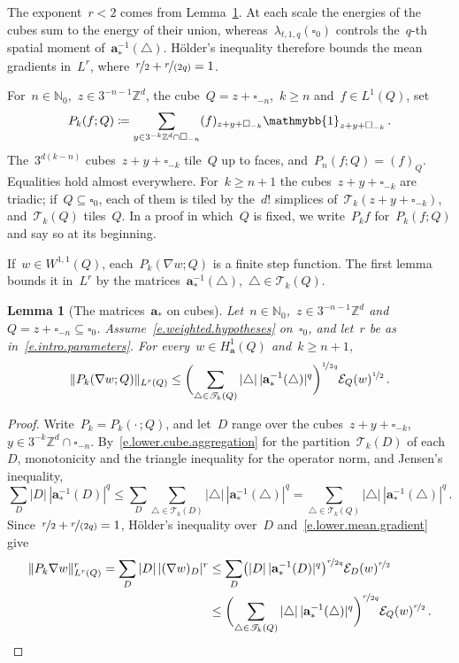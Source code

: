 \documentclass[11pt,letterpaper]{article}
\numberwithin{equation}{section}
\newtheorem{lemma}[theorem]{Lemma}
\theoremstyle{definition}
\newcommand{\N}{\mathbb{N}}
\newcommand{\Zd}{\mathbb{Z}^d}
\renewcommand{\a}{\mathbf{a}}
\newcommand{\nf}{\nicefrac}
\newcommand{\cu}{\square}
\DeclarePairedDelimiter{\norm}{\lVert}{\rVert}
\renewcommand{\subset}{\subseteq}
\newcommand{\indc}{{\mathmybb{1}}}
\newcommand{\Ener}{\mathcal E}
\begin{document}
The exponent~$r<2$ comes from Lemma~\ref{l.lower.averages}. At each scale the energies of the cubes sum to the energy of their union, whereas~$\lambda_{t,1,q}(\cu_0)$ controls the~$q$-th spatial moment of~$\a_*^{-1}(\triangle)$. H\"older's inequality therefore bounds the mean gradients in~$L^r$, where~$\nf r2+\nf r{(2q)}=1$.

\smallskip

For~$n\in\N_0$,~$z\in3^{-n-1}\Zd$, the cube~$Q=z+\cu_{-n}$,~$k\geq n$ and~$f\in L^1(Q)$, set
\begin{equation*}
	P_k(f;Q)\coloneqq\sum_{y\in3^{-k}\Zd\cap\cu_{-n}}(f)_{z+y+\cu_{-k}}\indc_{z+y+\cu_{-k}}\,.
\end{equation*}
The~$3^{d(k-n)}$ cubes~$z+y+\cu_{-k}$ tile~$Q$ up to faces, and~$P_n(f;Q)=(f)_Q$. Equalities hold almost everywhere. For~$k\geq n+1$ the cubes~$z+y+\cu_{-k}$ are triadic; if~$Q\subseteq\cu_0$, each of them is tiled by the~$d!$ simplices of~$\mathscr T_k(z+y+\cu_{-k})$, and~$\mathscr T_k(Q)$ tiles~$Q$. In a proof in which~$Q$ is fixed, we write~$P_kf$ for~$P_k(f;Q)$ and say so at its beginning.

\smallskip

If~$w\in W^{1,1}(Q)$, each~$P_k(\nabla w;Q)$ is a finite step function. The first lemma bounds it in~$L^r$ by the matrices~$\a_*^{-1}(\triangle)$,~$\triangle\in\mathscr T_k(Q)$.

\begin{lemma}[The matrices~$\a_*$ on cubes]
\label{l.lower.averages}
Let~$n\in\N_0$,~$z\in3^{-n-1}\Zd$ and~$Q=z+\cu_{-n}\subset\cu_0$. Assume~\eqref{e.weighted.hypotheses} on~$\cu_0$, and let~$r$ be as in~\eqref{e.intro.parameters}. For every~$w\in H^1_\a(Q)$ and~$k\geq n+1$,
\begin{equation}
	\norm{P_k(\nabla w;Q)}_{L^r(Q)}\leq\biggl(\sum_{\triangle\in\mathscr T_k(Q)}|\triangle|\,|\a_*^{-1}(\triangle)|^q\biggr)^{\nf1{2q}}\Ener_Q(w)^{\nf12}\,.
	\label{e.lower.spatial.holder}
\end{equation}
\end{lemma}

\begin{proof}
Write~$P_k=P_k(\cdot\,;Q)$, and let~$D$ range over the cubes~$z+y+\cu_{-k}$,~$y\in3^{-k}\Zd\cap\cu_{-n}$. By~\eqref{e.lower.cube.aggregation} for the partition~$\mathscr T_k(D)$ of each~$D$, monotonicity and the triangle inequality for the operator norm, and Jensen's inequality,
\begin{equation*}
	\sum_D|D|\,|\a_*^{-1}(D)|^q\leq\sum_D\sum_{\triangle\in\mathscr T_k(D)}|\triangle|\,|\a_*^{-1}(\triangle)|^q=\sum_{\triangle\in\mathscr T_k(Q)}|\triangle|\,|\a_*^{-1}(\triangle)|^q\,.
\end{equation*}
Since~$\nf{r}{2}+\nf{r}{(2q)}=1$, H\"older's inequality over~$D$ and~\eqref{e.lower.mean.gradient} give
\begin{align*}
	\norm{P_k\nabla w}_{L^r(Q)}^r=\sum_D|D|\,|(\nabla w)_D|^r&\leq\sum_D\bigl(|D|\,|\a_*^{-1}(D)|^q\bigr)^{\nf{r}{2q}}\Ener_D(w)^{\nf r2}\\
	&\leq\biggl(\sum_{\triangle\in\mathscr T_k(Q)}|\triangle|\,|\a_*^{-1}(\triangle)|^q\biggr)^{\nf r{2q}}\Ener_Q(w)^{\nf r2}\,.\qedhere
\end{align*}
\end{proof}
\end{document}
